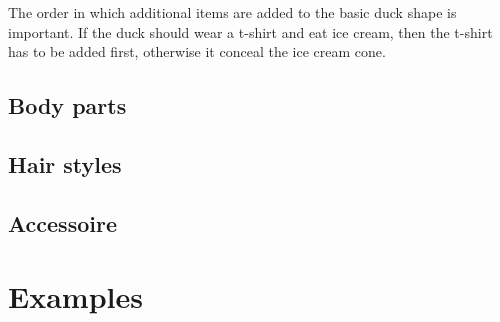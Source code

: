 \documentclass{ltxdockit}
\begin{document}
The order in which additional items are added to the basic duck shape is important. If the duck should wear a t-shirt and eat ice cream, then the t-shirt has to be added first, otherwise it conceal the ice cream cone.
 
\subsection{Body parts}

\subsection{Hair styles}

\subsection{Accessoire}

\section{Examples}
\end{document}
